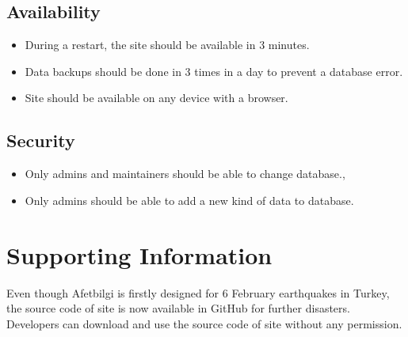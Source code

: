 \subsection{Availability}
\begin{itemize}
    \item During a restart, the site should be available in 3 minutes.
    \item Data backups should be done in 3 times in a day to prevent a database error.
    \item Site should be available on any device with a browser.
\end{itemize}

\subsection{Security}
\begin{itemize}
    \item Only admins and maintainers should be able to change database.,
    \item Only admins should be able to add a new kind of data to database.
\end{itemize}


\section{Supporting Information}
Even though Afetbilgi is firstly designed for 6 February earthquakes in Turkey, the source code of site is now available in GitHub for further disasters. Developers can download and use the source code of site without any permission.
